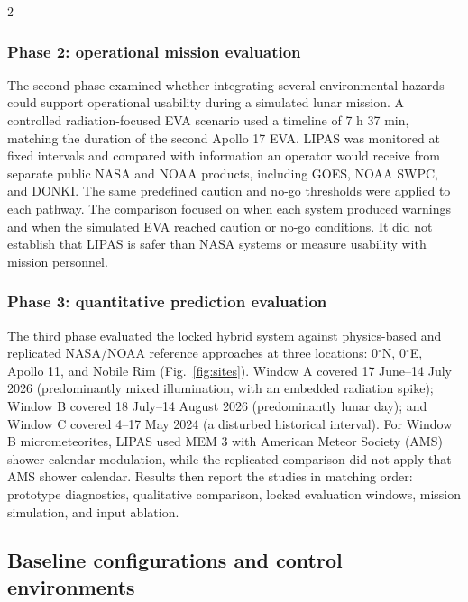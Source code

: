 \begin{multicols}{2}
\subsubsection{Phase 2: operational mission evaluation}

The second phase examined whether integrating several environmental hazards could support operational usability during a simulated lunar mission. A controlled radiation-focused EVA scenario used a timeline of 7 h 37 min, matching the duration of the second Apollo 17 EVA. LIPAS was monitored at fixed intervals and compared with information an operator would receive from separate public NASA and NOAA products, including GOES, NOAA SWPC, and DONKI. The same predefined caution and no-go thresholds were applied to each pathway. The comparison focused on when each system produced warnings and when the simulated EVA reached caution or no-go conditions. It did not establish that LIPAS is safer than NASA systems or measure usability with mission personnel.

\subsubsection{Phase 3: quantitative prediction evaluation}

The third phase evaluated the locked hybrid system against physics-based and replicated NASA/NOAA reference approaches at three locations: 0$^\circ$N, 0$^\circ$E, Apollo 11, and Nobile Rim (Fig.~\ref{fig:sites}). Window A covered 17 June--14 July 2026 (predominantly mixed illumination, with an embedded radiation spike); Window B covered 18 July--14 August 2026 (predominantly lunar day); and Window C covered 4--17 May 2024 (a disturbed historical interval). For Window B micrometeorites, LIPAS used MEM 3 with American Meteor Society (AMS) shower-calendar modulation, while the replicated comparison did not apply that AMS shower calendar. Results then report the studies in matching order: prototype diagnostics, qualitative comparison, locked evaluation windows, mission simulation, and input ablation.

\subsection{Baseline configurations and control environments}


\end{multicols}
